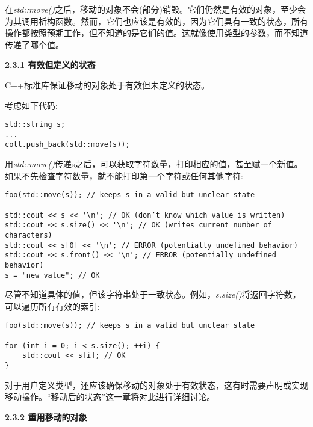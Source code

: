 在\textit{std::move()}之后，移动的对象不会(部分)销毁。它们仍然是有效的对象，至少会为其调用析构函数。然而，它们也应该是有效的，因为它们具有一致的状态，所有操作都按照预期工作，但不知道的是它们的值。这就像使用类型的参数，而不知道传递了哪个值。\par

\hspace*{\fill} \par %
\textbf{2.3.1 有效但定义的状态}

C++标准库保证移动的对象处于有效但未定义的状态。\par

考虑如下代码:\par

\begin{lstlisting}[caption={}]
std::string s;
...
coll.push_back(std::move(s));
\end{lstlisting}

用\textit{std::move()}传递s之后，可以获取字符数量，打印相应的值，甚至赋一个新值。如果不先检查字符数量，就不能打印第一个字符或任何其他字符:\par

\begin{lstlisting}[caption={}]
foo(std::move(s)); // keeps s in a valid but unclear state

std::cout << s << '\n'; // OK (don’t know which value is written)
std::cout << s.size() << '\n'; // OK (writes current number of characters)
std::cout << s[0] << '\n'; // ERROR (potentially undefined behavior)
std::cout << s.front() << '\n'; // ERROR (potentially undefined behavior)
s = "new value"; // OK
\end{lstlisting}

尽管不知道具体的值，但该字符串处于一致状态。例如，\textit{s.size()}将返回字符数，可以遍历所有有效的索引:\par

\begin{lstlisting}[caption={}]
foo(std::move(s)); // keeps s in a valid but unclear state

for (int i = 0; i < s.size(); ++i) {
	std::cout << s[i]; // OK
}
\end{lstlisting}

对于用户定义类型，还应该确保移动的对象处于有效状态，这有时需要声明或实现移动操作。“移动后的状态”这一章将对此进行详细讨论。\par

\hspace*{\fill} \par %
\textbf{2.3.2 重用移动的对象}

